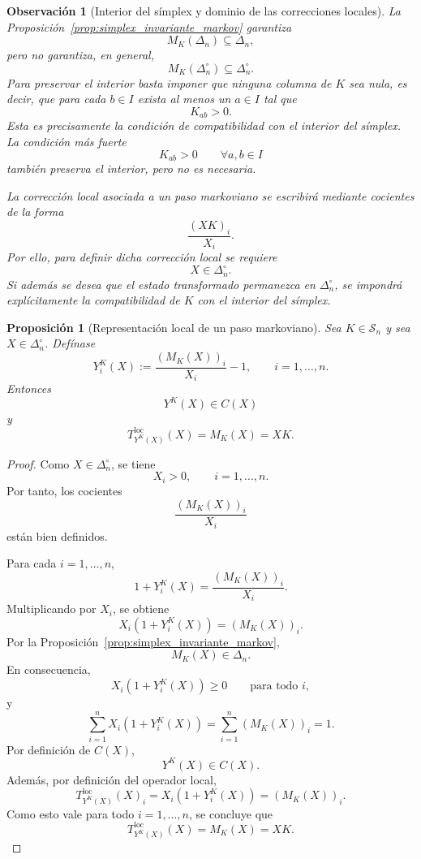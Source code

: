﻿\documentclass[12pt]{article}
\newtheorem{proposicion}{Proposición}[section]
\newtheorem{observacion}{Observación}[section]
\begin{document}
\begin{observacion}[Interior del símplex y dominio de las correcciones locales]\label{obs:interior_markov}
La Proposición~\ref{prop:simplex_invariante_markov} garantiza
\[
M_K(\Delta_n)\subseteq\Delta_n,
\]
pero no garantiza, en general,
\[
M_K(\Delta_n^\circ)\subseteq\Delta_n^\circ.
\]
Para preservar el interior basta imponer que ninguna columna de \(K\) sea nula, es decir, que para cada \(b\in I\) exista al menos un \(a\in I\) tal que
\[
K_{ab}>0.
\]
Esta es precisamente la condición de compatibilidad con el interior del símplex. La condición más fuerte
\[
K_{ab}>0\qquad\forall a,b\in I
\]
también preserva el interior, pero no es necesaria.

La corrección local asociada a un paso markoviano se escribirá mediante cocientes de la forma
\[
\frac{(XK)_i}{X_i}.
\]
Por ello, para definir dicha corrección local se requiere
\[
X\in\Delta_n^\circ.
\]
Si además se desea que el estado transformado permanezca en \(\Delta_n^\circ\), se impondrá explícitamente la compatibilidad de \(K\) con el interior del símplex.
\end{observacion}

\begin{proposicion}[Representación local de un paso markoviano]\label{prop:markov_como_correccion_local}
Sea \(K\in\mathcal S_n\) y sea \(X\in\Delta_n^\circ\). Defínase
\[
Y^K_i(X):=\frac{(M_K(X))_i}{X_i}-1,
\qquad i=1,\dots,n.
\]
Entonces
\[
Y^K(X)\in C(X)
\]
y
\[
T^{\mathrm{loc}}_{Y^K(X)}(X)=M_K(X)=XK.
\]
\end{proposicion}

\begin{proof}
Como \(X\in\Delta_n^\circ\), se tiene
\[
X_i>0,\qquad i=1,\dots,n.
\]
Por tanto, los cocientes
\[
\frac{(M_K(X))_i}{X_i}
\]
están bien definidos.

Para cada \(i=1,\dots,n\),
\[
1+Y^K_i(X)
=
\frac{(M_K(X))_i}{X_i}.
\]
Multiplicando por \(X_i\), se obtiene
\[
X_i(1+Y^K_i(X))
=
(M_K(X))_i.
\]
Por la Proposición~\ref{prop:simplex_invariante_markov},
\[
M_K(X)\in\Delta_n.
\]
En consecuencia,
\[
X_i(1+Y^K_i(X))\ge 0
\qquad
\text{para todo }i,
\]
y
\[
\sum_{i=1}^n X_i(1+Y^K_i(X))
=
\sum_{i=1}^n (M_K(X))_i
=
1.
\]
Por definición de \(C(X)\),
\[
Y^K(X)\in C(X).
\]
Además, por definición del operador local,
\[
T^{\mathrm{loc}}_{Y^K(X)}(X)_i
=
X_i(1+Y^K_i(X))
=
(M_K(X))_i.
\]
Como esto vale para todo \(i=1,\dots,n\), se concluye que
\[
T^{\mathrm{loc}}_{Y^K(X)}(X)=M_K(X)=XK.
\]
\end{proof}
\end{document}
